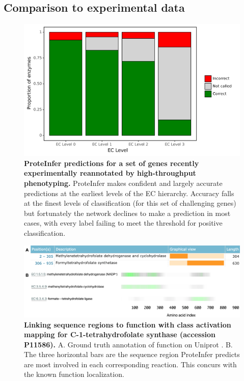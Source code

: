 \subsection*{Comparison to experimental data}
\begin{figure}
\centering
  \includegraphics[width=\columnwidth]{Figures/price.png}%
  \caption{\textbf{ProteInfer predictions for a set of genes recently experimentally reannotated by high-throughput phenotyping.} ProteInfer makes confident and largely accurate predictions at the earliest levels of the EC hierarchy. Accuracy falls at the finest levels of classification (for this set of challenging genes) but fortunately the network declines to make a prediction in most cases, with every label failing to meet the threshold for positive classification. \label{fig:levels}}
\end{figure}
\begin{figure}[b]
\centering
  \includegraphics[width=\textwidth]{Figures/tetrahydrofolate_synthase.png}
  \caption{\textbf{Linking sequence regions to function with class activation mapping for C-1-tetrahydrofolate synthase (accession P11586).} A. Ground truth annotation of function on Uniprot \citep{uniprotlatest}. B. The three horizontal bars are the sequence region ProteInfer predicts are most involved in each corresponding reaction. This concurs with the known function localization. }
  \label{fig:cam}
\end{figure}

